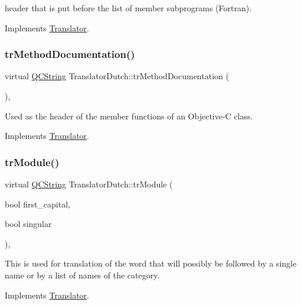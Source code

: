 header that is put before the list of member subprograms (Fortran). 

Implements \mbox{\hyperlink{class_translator}{Translator}}.

\mbox{\label{class_translator_dutch_aeeabf211fdd1969c265ef65c27898a0c}} 
\subsubsection{\texorpdfstring{trMethodDocumentation()}{trMethodDocumentation()}}
{\footnotesize\ttfamily virtual \mbox{\hyperlink{class_q_c_string}{Q\+C\+String}} Translator\+Dutch\+::tr\+Method\+Documentation (\begin{DoxyParamCaption}{ }\end{DoxyParamCaption})\hspace{0.3cm}{\ttfamily [inline]}, {\ttfamily [virtual]}}

Used as the header of the member functions of an Objective-\/C class. 

Implements \mbox{\hyperlink{class_translator}{Translator}}.

\mbox{\label{class_translator_dutch_aa6ddadc6424b2a267dad61e354b50489}} 
\subsubsection{\texorpdfstring{trModule()}{trModule()}}
{\footnotesize\ttfamily virtual \mbox{\hyperlink{class_q_c_string}{Q\+C\+String}} Translator\+Dutch\+::tr\+Module (\begin{DoxyParamCaption}\item[{bool}]{first\+\_\+capital,  }\item[{bool}]{singular }\end{DoxyParamCaption})\hspace{0.3cm}{\ttfamily [inline]}, {\ttfamily [virtual]}}

This is used for translation of the word that will possibly be followed by a single name or by a list of names of the category. 

Implements \mbox{\hyperlink{class_translator}{Translator}}.

